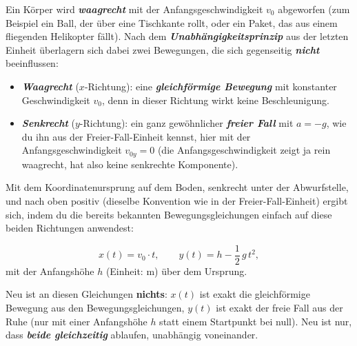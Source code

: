 \documentclass[addpoints,11pt,a4paper]{exam}
\begin{document}
\begin{theoriebox}
Ein Körper wird \textbf{\emph{waagrecht}} mit der Anfangsgeschwindigkeit
$v_0$ abgeworfen (zum Beispiel ein Ball, der über eine Tischkante rollt,
oder ein Paket, das aus einem fliegenden Helikopter fällt). Nach dem
\textbf{\emph{Unabhängigkeitsprinzip}} aus der letzten Einheit überlagern
sich dabei zwei Bewegungen, die sich gegenseitig \textbf{\emph{nicht}}
beeinflussen:

\begin{itemize}[leftmargin=1.2cm,itemsep=0.2em]
  \item \textbf{\emph{Waagrecht}} ($x$-Richtung): eine \textbf{\emph{gleichförmige
  Bewegung}} mit konstanter Geschwindigkeit $v_0$, denn in dieser Richtung
  wirkt keine Beschleunigung.
  \item \textbf{\emph{Senkrecht}} ($y$-Richtung): ein ganz gewöhnlicher
  \textbf{\emph{freier Fall}} mit $a=-g$, wie du ihn aus der
  Freier-Fall-Einheit kennst, hier mit der Anfangsgeschwindigkeit $v_{0y}=0$
  (die Anfangsgeschwindigkeit zeigt ja rein waagrecht, hat also keine
  senkrechte Komponente).
\end{itemize}

Mit dem Koordinatenursprung auf dem Boden, senkrecht unter der
Abwurfstelle, und \glqq nach oben positiv\grqq{} (dieselbe Konvention wie
in der Freier-Fall-Einheit) ergibt sich, indem du die bereits bekannten
Bewegungsgleichungen einfach auf diese beiden Richtungen anwendest:
\begin{formelbox}
\[
  \boxed{x(t) = v_0 \cdot t}, \qquad \boxed{y(t) = h - \frac{1}{2}\,g\,t^2},
\]
mit der Anfangshöhe $h$ (Einheit: $\si{\meter}$) über dem Ursprung.
\end{formelbox}

\begin{hinweisbox}
Neu ist an diesen Gleichungen \textbf{nichts}: $x(t)$ ist exakt die
gleichförmige Bewegung aus den Bewegungsgleichungen, $y(t)$ ist exakt der
freie Fall aus der Ruhe (nur mit einer Anfangshöhe $h$ statt einem
Startpunkt bei null). Neu ist nur, dass \textbf{\emph{beide gleichzeitig}}
ablaufen, unabhängig voneinander.
\end{hinweisbox}


\end{theoriebox}
\end{document}
